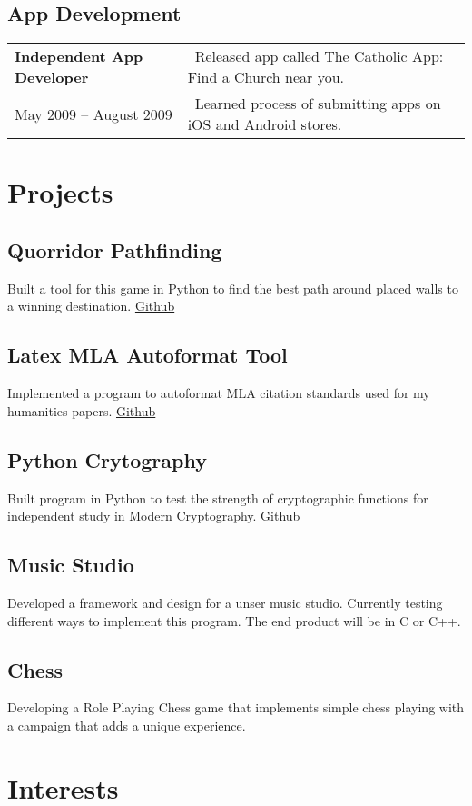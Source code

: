 \documentclass{article}[11pt]
\begin{document}
	\subsection*{App Development}
	\begin{tabular}{@{}p{5cm}l}
		\textbf{Independent App Developer}	& \textbullet\ Released app called The Catholic App: Find a Church near you. \\
	May 2009 -- August 2009 	& \textbullet\ Learned process of submitting apps on iOS and Android stores.
	\end{tabular}
\begin{multicols}{2}
	\section*{Projects}
		\subsection*{Quorridor Pathfinding}
		Built a tool for this game in Python to find the best path around placed walls to a winning destination. \href{https://github.com/bizzk3t/Graph}{Github}
		\subsection*{Latex MLA Autoformat Tool}
		Implemented a program to autoformat MLA citation standards used for my humanities papers. \href{https://github.com/bizzk3t/LatexMLA}{Github}
		\subsection*{Python Crytography}
		Built program in Python to test the strength of cryptographic functions for independent study in Modern Cryptography. \href{https://github.com/bizzk3t/PythonCrypto}{Github}
		\subsection*{Music Studio}
		Developed a framework and design for a unser music studio. Currently testing different ways to implement this program. The end product will be in C or C++.
	\subsection*{Chess}
		Developing a Role Playing Chess game that implements simple chess playing with a campaign that adds a unique experience.
		\vfill
		\columnbreak
	\section*{Interests}

\end{multicols}
\end{document}
